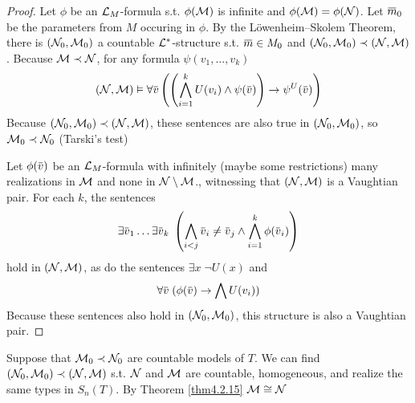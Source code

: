 \documentclass[11pt]{article}
\begin{document}
\begin{proof}
Let \(\phi\) be an \(\mathcal{L}_M\)-formula s.t. \(\phi(\mathcal{M})\) is infinite and \(\phi(\mathcal{M})=\phi(\mathcal{N})\). Let \(\barm_0\) be the
parameters from \(M\) occuring in \(\phi\). By the Löwenheim–Skolem Theorem, there is \((\mathcal{N}_0,\mathcal{M}_0)\) a
countable \(\mathcal{L}^*\)-structure s.t. \(\barm\in M_0\) and \((\mathcal{N}_0,\mathcal{M}_0)\prec(\mathcal{N},\mathcal{M})\). Because \(\mathcal{M}\prec\mathcal{N}\), for
any formula \(\psi(v_1,\dots,v_k)\)
\begin{equation*}
(\caln,\calm)\vDash\forall\barv\left( \left( \bigwedge_{i=1}^kU(v_i)\wedge\psi(\barv) \right)\to\psi^U(\barv) \right)
\end{equation*}
Because \((\mathcal{N}_0,\mathcal{M}_0)\prec(\mathcal{N},\mathcal{M})\), these sentences are also true in \((\mathcal{N}_0,\mathcal{M}_0)\), so \(\mathcal{M}_0\prec\mathcal{N}_0\)
(Tarski's test)

Let \(\phi(\barv)\) be an \(\mathcal{L}_M\)-formula with infinitely (maybe some restrictions) many realizations in \(\mathcal{M}\) and none
in \(\mathcal{N}\setminus\mathcal{M}\)., witnessing that \((\mathcal{N},\mathcal{M})\) is a Vaughtian pair. For each \(k\), the sentences
\begin{equation*}
\exists\barv_1\dots\exists\barv_k\;\left( \bigwedge_{i<j}\barv_i\neq\barv_j\wedge\bigwedge_{i=1}^k\phi(\barv_i) \right)
\end{equation*}
hold in \((\mathcal{N},\mathcal{M})\), as do the sentences \(\exists x\;\neg U(x)\) and
\begin{equation*}
\forall\barv\;(\phi(\barv)\to\bigwedge U(v_i))
\end{equation*}
Because these sentences also hold in \((\mathcal{N}_0,\mathcal{M}_0)\), this structure is also a Vaughtian pair.
\end{proof}

\begin{lemma}[]
Suppose that \(\mathcal{M}_0\prec\mathcal{N}_0\) are countable models of \(T\). We can find \((\mathcal{N}_0,\mathcal{M}_0)\prec(\mathcal{N},\mathcal{M})\)
s.t. \(\mathcal{N}\) and \(\mathcal{M}\) are countable, homogeneous, and realize the same types in \(S_n(T)\). By
Theorem \ref{thm4.2.15} \(\mathcal{M}\cong\mathcal{N}\)
\end{lemma}
\end{document}
